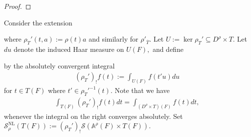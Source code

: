 \documentclass[10pt]{amsart}
\theoremstyle{definition}
\numberwithin{equation}{section}
\DeclareMathOperator{\Gal}{\mathrm{Gal}}
\numberwithin{equation}{subsection}
\newcommand{\CC}{\mathbb{C}}
\newcommand{\GG}{\mathbb{G}}
\begin{document}
\begin{proof}

\end{proof}



 Consider the extension
\begin{center}
\end{center}
where $\rho_T'(t,a):=\rho(t)a$ and similarly for $\rho'_{\overline{T}}.$ Let $U:=\ker\rho_T' \subseteq D^\rho\times T$. Let $du$ denote the induced Haar measure on $U(F),$ and define 
\begin{center}
\end{center}
by the absolutely convergent integral
\begin{align*}
    (\rho_{T}')_!f(t) := \int_{U(F)} f(t'u) du
\end{align*}
for $t\in T(F)$ where $t'\in \rho_T'^{-1}(t)$. Note that we have
\begin{align*}
     \int_{T(F)}(\rho_{T}')_!f(t)dt=\int_{(D^\rho\times T)(F)} f(t)dt,
\end{align*}
whenever the integral on the right converges absolutely. Set $\mathcal{S}^{\mathrm{NL}}_\rho(T(F)) := (\rho_T')_!\mathcal{S}(\mathbb{A}^\rho(F)\times T(F)).$
\end{document}

